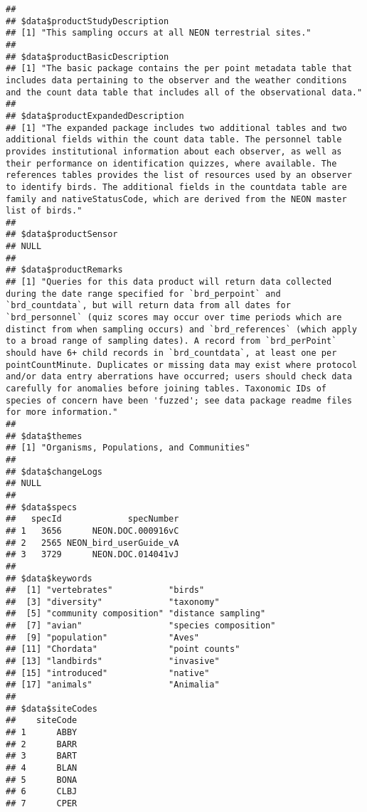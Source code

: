 \documentclass[]{book}
\begin{document}
\begin{verbatim}
## 
## $data$productStudyDescription
## [1] "This sampling occurs at all NEON terrestrial sites."
## 
## $data$productBasicDescription
## [1] "The basic package contains the per point metadata table that includes data pertaining to the observer and the weather conditions and the count data table that includes all of the observational data."
## 
## $data$productExpandedDescription
## [1] "The expanded package includes two additional tables and two additional fields within the count data table. The personnel table provides institutional information about each observer, as well as their performance on identification quizzes, where available. The references tables provides the list of resources used by an observer to identify birds. The additional fields in the countdata table are family and nativeStatusCode, which are derived from the NEON master list of birds."
## 
## $data$productSensor
## NULL
## 
## $data$productRemarks
## [1] "Queries for this data product will return data collected during the date range specified for `brd_perpoint` and `brd_countdata`, but will return data from all dates for `brd_personnel` (quiz scores may occur over time periods which are distinct from when sampling occurs) and `brd_references` (which apply to a broad range of sampling dates). A record from `brd_perPoint` should have 6+ child records in `brd_countdata`, at least one per pointCountMinute. Duplicates or missing data may exist where protocol and/or data entry aberrations have occurred; users should check data carefully for anomalies before joining tables. Taxonomic IDs of species of concern have been 'fuzzed'; see data package readme files for more information."
## 
## $data$themes
## [1] "Organisms, Populations, and Communities"
## 
## $data$changeLogs
## NULL
## 
## $data$specs
##   specId             specNumber
## 1   3656      NEON.DOC.000916vC
## 2   2565 NEON_bird_userGuide_vA
## 3   3729      NEON.DOC.014041vJ
## 
## $data$keywords
##  [1] "vertebrates"           "birds"                
##  [3] "diversity"             "taxonomy"             
##  [5] "community composition" "distance sampling"    
##  [7] "avian"                 "species composition"  
##  [9] "population"            "Aves"                 
## [11] "Chordata"              "point counts"         
## [13] "landbirds"             "invasive"             
## [15] "introduced"            "native"               
## [17] "animals"               "Animalia"             
## 
## $data$siteCodes
##    siteCode
## 1      ABBY
## 2      BARR
## 3      BART
## 4      BLAN
## 5      BONA
## 6      CLBJ
## 7      CPER

\end{verbatim}
\end{document}
